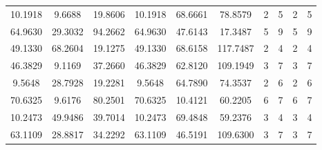 \documentclass[withoutpreface,bwprint]{cumcmthesis} %
\begin{document}
\begin{appendices}
\begin{table}[htbp!]
\begin{tabular}{@{}cccccccccc@{}}
						10.1918                          & 9.6688                           & 19.8606                          & 10.1918                          & 68.6661                          & 78.8579                          & 2                    & 5                    & 2                      & 5                      \\
						64.9630                          & 29.3032                          & 94.2662                          & 64.9630                          & 47.6143                          & 17.3487                          & 5                    & 9                    & 5                      & 9                      \\
						49.1330                          & 68.2604                          & 19.1275                          & 49.1330                          & 68.6158                          & 117.7487                         & 2                    & 4                    & 2                      & 4                      \\
						46.3829                          & 9.1169                           & 37.2660                          & 46.3829                          & 62.8120                          & 109.1949                         & 3                    & 7                    & 3                      & 7                      \\
						9.5648                           & 28.7928                          & 19.2281                          & 9.5648                           & 64.7890                          & 74.3537                          & 2                    & 6                    & 2                      & 6                      \\
						70.6325                          & 9.6176                           & 80.2501                          & 70.6325                          & 10.4121                          & 60.2205                          & 6                    & 7                    & 6                      & 7                      \\
						10.2473                          & 49.9486                          & 39.7014                          & 10.2473                          & 69.4848                          & 59.2376                          & 3                    & 4                    & 3                      & 4                      \\
						63.1109                          & 28.8817                          & 34.2292                          & 63.1109                          & 46.5191                          & 109.6300                         & 3                    & 7                    & 3                      & 7                      \\

\end{tabular}
\end{table}
\end{appendices}
\end{document}
